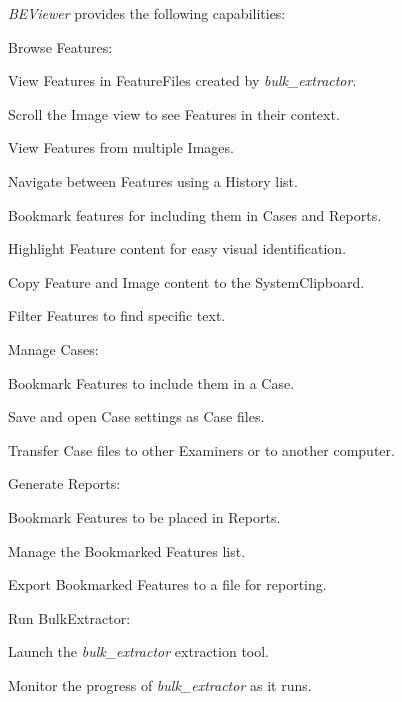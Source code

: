 \documentclass[10pt,twoside]{article}
\newcommand{\bulk}{\emph{bulk\_extractor}\xspace}
\newcommand{\bev}{\emph{BEViewer}\xspace}
\begin{document}
\bev provides the following capabilities:
\begin{compactitem}
\item Browse \glspl{Feature}:
\begin{compactitem}
\item View Features in \glspl{FeatureFile} created by \bulk.
\item Scroll the \gls{Image} view to see Features in their context.
\item View Features from multiple Images.
\item \gls{Navigate} between Features using a History list.
\item \gls{Bookmark} features for including them in Cases and Reports.
\item \gls{Highlight} Feature content for easy visual identification.
\item Copy Feature and Image content to the \gls{SystemClipboard}.
\item Filter Features to find specific text.
\end{compactitem}
\item Manage \glspl{Case}:
\begin{compactitem}
\item Bookmark Features to include them in a Case.
\item Save and open Case settings as Case files.
\item Transfer Case files to other Examiners or to another computer.
\end{compactitem}
\item Generate \glspl{Report}:
\begin{compactitem}
\item Bookmark Features to be placed in Reports.
\item Manage the Bookmarked Features list.
\item Export Bookmarked Features to a file for reporting.
\end{compactitem}
\item Run \gls{BulkExtractor}:
\begin{compactitem}
\item Launch the \bulk extraction tool.
\item Monitor the progress of \bulk as it runs.
\end{compactitem}
\end{compactitem}
\end{document}
